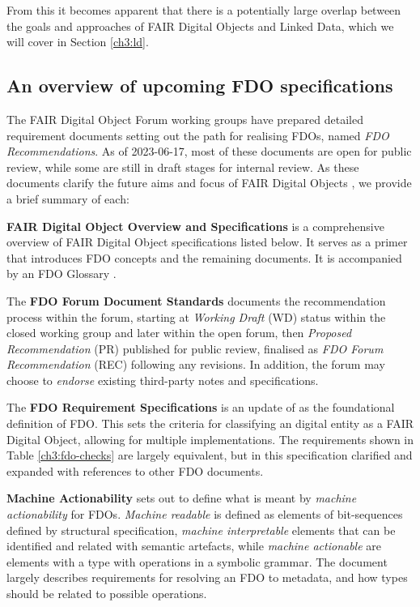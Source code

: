 From this it becomes apparent that there is a potentially large overlap between the goals and approaches of FAIR Digital Objects and Linked Data, which we will cover in Section \vref{ch3:ld}.


\subsection{An overview of upcoming FDO specifications}\label{ch3:next-step-fdo}

The FAIR Digital Object Forum \cite{FAIRDigitalObjects} working groups have prepared detailed requirement documents \cite{FDO Specs} setting out the path for realising FDOs, named \emph{FDO Recommendations}. As of 2023-06-17, most of these documents are open for public review, while some are still in draft stages for internal review. As these documents clarify the future aims and focus of FAIR Digital Objects \cite{Lannom 2022b}, we provide a brief summary of each:

\textbf{FAIR Digital Object Overview and Specifications} \cite{Ivonne 2023} is a comprehensive overview of FAIR Digital Object specifications listed below. It serves as a primer that introduces FDO concepts and the remaining documents. It is accompanied by an FDO Glossary \cite{Broeder 2022}.

The \textbf{FDO Forum Document Standards} \cite{Weiland 2022a} documents the recommendation process within the forum, starting at \emph{Working Draft} (WD) status within the closed working group and later within the open forum, then \emph{Proposed Recommendation} (PR) published for public review, finalised as \emph{FDO Forum Recommendation} (REC) following any revisions. In addition, the forum may choose to \emph{endorse} existing third-party notes and specifications.

The \textbf{FDO Requirement Specifications} \cite{Anders 2023} is an update of \cite{Bonino 2019} as the foundational definition of FDO. This sets the criteria for classifying an digital entity as a FAIR Digital Object, allowing for multiple implementations. The requirements shown in Table \vref{ch3:fdo-checks} are largely equivalent, but in this specification clarified and expanded with references to other FDO documents.

\textbf{Machine Actionability}\label{def:machineactionable} \cite{Weiland 2022b} sets out to define what is meant by \emph{machine actionability} for FDOs. \emph{Machine readable} is defined as elements of bit-sequences defined by structural specification, \emph{machine interpretable} elements that can be identified and related with semantic artefacts, while \emph{machine actionable} are elements with a type with operations in a symbolic grammar. The document largely describes requirements for resolving an FDO to metadata, and how types should be related to possible operations.

